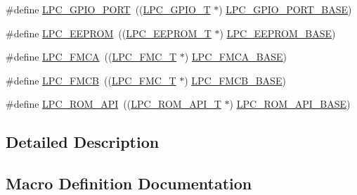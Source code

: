 \begin{DoxyCompactItemize}
\item 
\#define \hyperlink{group___p_e_r_i_p_h__18_x_x___b_a_s_e_ga401a76842ea88d6e311bba578f43b259}{L\+P\+C\+\_\+\+G\+P\+I\+O\+\_\+\+P\+O\+RT}~((\hyperlink{struct_l_p_c___g_p_i_o___t}{L\+P\+C\+\_\+\+G\+P\+I\+O\+\_\+T}             $\ast$) \hyperlink{group___p_e_r_i_p_h__43_x_x___b_a_s_e_ga7de0e57c07a6bd4ff8cf9f2b85249ed4}{L\+P\+C\+\_\+\+G\+P\+I\+O\+\_\+\+P\+O\+R\+T\+\_\+\+B\+A\+SE})
\item 
\#define \hyperlink{group___p_e_r_i_p_h__18_x_x___b_a_s_e_ga3af7cc9a426f661ac4deee8a9997a830}{L\+P\+C\+\_\+\+E\+E\+P\+R\+OM}~((\hyperlink{struct_l_p_c___e_e_p_r_o_m___t}{L\+P\+C\+\_\+\+E\+E\+P\+R\+O\+M\+\_\+T}           $\ast$) \hyperlink{group___p_e_r_i_p_h__43_x_x___b_a_s_e_ga9d1fcaafb9feb0f8253c3cef1edc7e9f}{L\+P\+C\+\_\+\+E\+E\+P\+R\+O\+M\+\_\+\+B\+A\+SE})
\item 
\#define \hyperlink{group___p_e_r_i_p_h__18_x_x___b_a_s_e_ga3337d6fd79512d56b2c2362cb48b0ff5}{L\+P\+C\+\_\+\+F\+M\+CA}~((\hyperlink{struct_l_p_c___f_m_c___t}{L\+P\+C\+\_\+\+F\+M\+C\+\_\+T}              $\ast$) \hyperlink{group___p_e_r_i_p_h__43_x_x___b_a_s_e_gaf59ae457b89f9991f1528a5625234445}{L\+P\+C\+\_\+\+F\+M\+C\+A\+\_\+\+B\+A\+SE})
\item 
\#define \hyperlink{group___p_e_r_i_p_h__18_x_x___b_a_s_e_ga13ff7e03af04887218e740c984f0af3e}{L\+P\+C\+\_\+\+F\+M\+CB}~((\hyperlink{struct_l_p_c___f_m_c___t}{L\+P\+C\+\_\+\+F\+M\+C\+\_\+T}              $\ast$) \hyperlink{group___p_e_r_i_p_h__43_x_x___b_a_s_e_ga9c9492ce5a1b5e99d6500db256f020c6}{L\+P\+C\+\_\+\+F\+M\+C\+B\+\_\+\+B\+A\+SE})
\item 
\#define \hyperlink{group___p_e_r_i_p_h__18_x_x___b_a_s_e_ga93f07fc38c09c20a7141e175ce599ef7}{L\+P\+C\+\_\+\+R\+O\+M\+\_\+\+A\+PI}~((\hyperlink{struct_l_p_c___r_o_m___a_p_i___t}{L\+P\+C\+\_\+\+R\+O\+M\+\_\+\+A\+P\+I\+\_\+T}          $\ast$) \hyperlink{group___p_e_r_i_p_h__43_x_x___b_a_s_e_ga2ae00d891b7603694f3a1eb640013f63}{L\+P\+C\+\_\+\+R\+O\+M\+\_\+\+A\+P\+I\+\_\+\+B\+A\+SE})
\end{DoxyCompactItemize}


\subsection{Detailed Description}


\subsection{Macro Definition Documentation}
\mbox{\label{group___p_e_r_i_p_h__18_x_x___b_a_s_e_gabbf7aa3d208a94071e0315856398a6cd}} 
